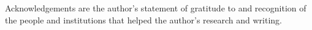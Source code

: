 \begin{acknowledgement}

Acknowledgements are the author's statement of gratitude to and recognition of the people and institutions that helped the author's research and writing.

    \lipsum[5]
\end{acknowledgement}
